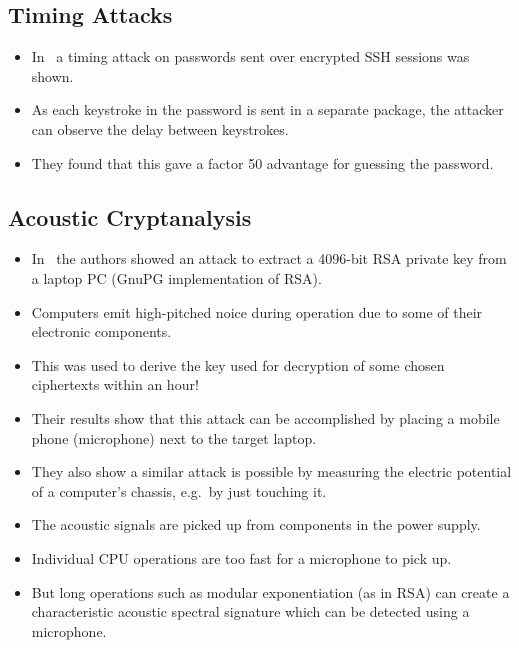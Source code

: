 \documentclass{beamer}
\begin{document}
\subsection{Timing Attacks}

\begin{frame}
  \begin{itemize}
    \item In~\cite{song2001timing} a timing attack on passwords sent over 
      encrypted SSH sessions was shown.

    \item As each keystroke in the password is sent in a separate package, the 
      attacker can observe the delay between keystrokes.

    \item They found that this gave a factor 50 advantage for guessing the 
      password.
  \end{itemize}
\end{frame}

\subsection{Acoustic Cryptanalysis}

\begin{frame}
  \begin{itemize}
    \item In~\cite{genkin2013rsa} the authors showed an attack to extract 
      a 4096-bit RSA private key from a laptop PC (GnuPG implementation of 
      RSA).

    \item Computers emit high-pitched noice during operation due to some of 
      their electronic components.

    \item This was used to derive the key used for decryption of some chosen 
      ciphertexts within an hour!

    \item Their results show that this attack can be accomplished by placing 
      a mobile phone (microphone) next to the target laptop.

    \item They also show a similar attack is possible by measuring the electric 
      potential of a computer's chassis, e.g.\ by just touching it.
  \end{itemize}
\end{frame}

\begin{frame}
  \begin{itemize}
    \item The acoustic signals are picked up from components in the power 
      supply.

    \item Individual CPU operations are too fast for a microphone to pick up.

    \item But long operations such as modular exponentiation (as in RSA) can 
      create a characteristic acoustic spectral signature which can be detected 
      using a microphone.
  \end{itemize}
\end{frame}
\end{document}
